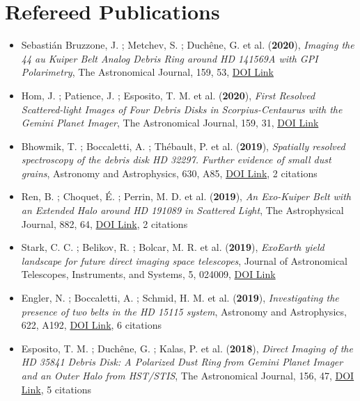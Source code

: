 \documentclass[11pt]{article}
\begin{document}
\section*{Refereed Publications}

\begin{itemize}\itemsep 0pt


\item Sebasti{\'a}n Bruzzone, J. ; Metchev, S. ; Duch{\^e}ne, G. et al. ({\bf2020}), {\it Imaging the 44 au Kuiper Belt Analog Debris Ring around HD 141569A with GPI Polarimetry}, The Astronomical Journal, 159, 53, \href{https://doi.org/10.3847/1538-3881/ab5d2e}{DOI Link}

\item Hom, J. ; Patience, J. ; Esposito, T. M. et al. ({\bf2020}), {\it First Resolved Scattered-light Images of Four Debris Disks in Scorpius-Centaurus with the Gemini Planet Imager}, The Astronomical Journal, 159, 31, \href{https://doi.org/10.3847/1538-3881/ab5af2}{DOI Link}

\item Bhowmik, T. ; Boccaletti, A. ; Th{\'e}bault, P. et al. ({\bf2019}), {\it Spatially resolved spectroscopy of the debris disk HD 32297. Further evidence of small dust grains}, Astronomy and Astrophysics, 630, A85, \href{https://doi.org/10.1051/0004-6361/201936076}{DOI Link}, 2 citations

\item Ren, B. ; Choquet, {\'E}. ; Perrin, M. D. et al. ({\bf2019}), {\it An Exo-Kuiper Belt with an Extended Halo around HD 191089 in Scattered Light}, The Astrophysical Journal, 882, 64, \href{https://doi.org/10.3847/1538-4357/ab3403}{DOI Link}, 2 citations

\item Stark, C. C. ; Belikov, R. ; Bolcar, M. R. et al. ({\bf2019}), {\it ExoEarth yield landscape for future direct imaging space telescopes}, Journal of Astronomical Telescopes, Instruments, and Systems, 5, 024009, \href{https://doi.org/10.1117/1.JATIS.5.2.024009}{DOI Link}

\item Engler, N. ; Boccaletti, A. ; Schmid, H. M. et al. ({\bf2019}), {\it Investigating the presence of two belts in the HD 15115 system}, Astronomy and Astrophysics, 622, A192, \href{https://doi.org/10.1051/0004-6361/201833542}{DOI Link}, 6 citations

\item Esposito, T. M. ; Duch{\^e}ne, G. ; Kalas, P. et al. ({\bf2018}), {\it Direct Imaging of the HD 35841 Debris Disk: A Polarized Dust Ring from Gemini Planet Imager and an Outer Halo from HST/STIS}, The Astronomical Journal, 156, 47, \href{https://doi.org/10.3847/1538-3881/aacbc9}{DOI Link}, 5 citations


\end{itemize}
\end{document}
